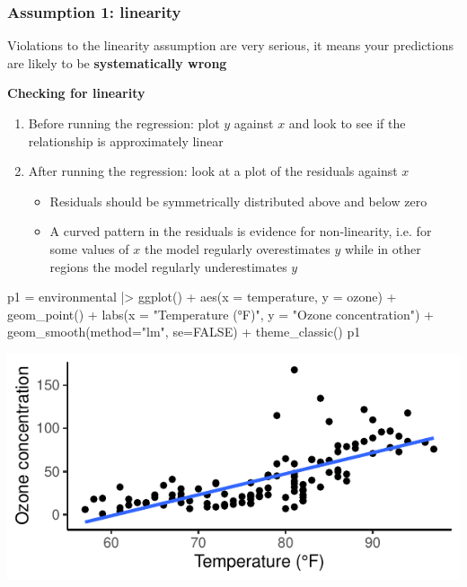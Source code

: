 \documentclass[a4paper]{article}\usepackage[]{graphicx}\usepackage[]{xcolor}
\makeatletter
\def\maxwidth{ %
  \ifdim\Gin@nat@width>\linewidth
    \linewidth
  \else
    \Gin@nat@width
  \fi
}
\makeatother
\begin{document}
\subsubsection{Assumption 1: linearity}
\begin{goldbox}
	Violations to the linearity assumption are very serious, it means your predictions are likely to be \textcolor{myblue}{\textbf{systematically wrong}}
\end{goldbox}
\textbf{Checking for linearity}
\begin{enumerate}
	\item Before running the regression: plot \( y \) against \( x \) and look to see if the relationship is approximately linear
	\item After running the regression: look at a plot of the residuals against \( x \)
	\begin{itemize}
		\item Residuals should be symmetrically distributed above and below zero
		\item A curved pattern in the residuals is evidence for non-linearity, i.e. for some values of \( x \) the model regularly overestimates \( y \) while in other regions the model regularly underestimates \( y \) 
	\end{itemize}
\end{enumerate}
\begin{minipage}[t]{0.49\textwidth}
\begin{Schunk}
\begin{Sinput}
p1 = environmental |> ggplot() + 
  aes(x = temperature, y = ozone) + 
  geom_point() + 
  labs(x = "Temperature (°F)",
       y = "Ozone concentration") +
  geom_smooth(method="lm", se=FALSE) +
  theme_classic()
p1
\end{Sinput}


{\centering \includegraphics[width=\maxwidth]{figure/listings-unnamed-chunk-343-1} 

}

\end{Schunk}
\end{minipage}
\end{document}
